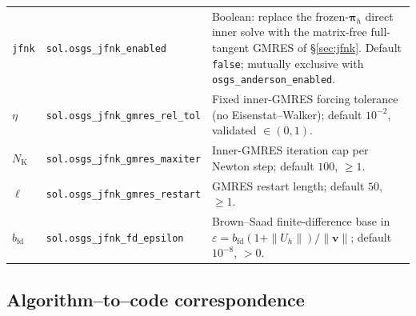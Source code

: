 \documentclass{article}
\newcommand{\code}[1]{\texttt{\small #1}}
\begin{document}
\begin{table}[h]
\begin{tabularx}{\textwidth}{@{} l l X @{}}
\code{jfnk}              & \code{sol.osgs\_jfnk\_enabled}           & Boolean: replace the frozen-$\boldsymbol{\pi}_h$ direct inner solve with the matrix-free full-tangent GMRES of §\ref{sec:jfnk}. Default \code{false}; mutually exclusive with \code{osgs\_anderson\_enabled}. \\
$\eta$                   & \code{sol.osgs\_jfnk\_gmres\_rel\_tol}   & Fixed inner-GMRES forcing tolerance (no Eisenstat--Walker); default $10^{-2}$, validated $\in(0,1)$. \\
$N_{\mathrm{K}}$         & \code{sol.osgs\_jfnk\_gmres\_maxiter}    & Inner-GMRES iteration cap per Newton step; default $100$, $\ge 1$. \\
$\ell$                   & \code{sol.osgs\_jfnk\_gmres\_restart}    & GMRES restart length; default $50$, $\ge 1$. \\
$b_{\mathrm{fd}}$        & \code{sol.osgs\_jfnk\_fd\_epsilon}       & Brown--Saad finite-difference base in $\varepsilon = b_{\mathrm{fd}}(1+\|U_h\|)/\|\boldsymbol{v}\|$; default $10^{-8}$, $>0$. \\
\bottomrule
\end{tabularx}
\end{table}

\subsection{Algorithm--to--code correspondence}
\end{document}
